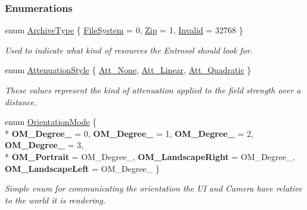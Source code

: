 \subsubsection*{Enumerations}
\begin{DoxyCompactItemize}
\item 
enum \hyperlink{namespaceMezzanine_a25d7f893350196fa99e164f78df3538b}{Archive\-Type} \{ \hyperlink{namespaceMezzanine_a25d7f893350196fa99e164f78df3538ba7d47095245d0d616e56790ddb06978c9}{File\-System} =  0, 
\hyperlink{namespaceMezzanine_a25d7f893350196fa99e164f78df3538ba43428c8ab05d1ac46abc95c021496360}{Zip} =  1, 
\hyperlink{namespaceMezzanine_a25d7f893350196fa99e164f78df3538bac1790df125a6142b8a5b550c95763de5}{Invalid} =  32768
 \}
\begin{DoxyCompactList}\small\item\em Used to indicate what kind of resources the Entrosol should look for. \end{DoxyCompactList}\item 
enum \hyperlink{namespaceMezzanine_a2d10a79e11a2031df10af540eede12fa}{Attenuation\-Style} \{ \hyperlink{namespaceMezzanine_a2d10a79e11a2031df10af540eede12faa548ff9c1d108b12ea6323d39c41856f5}{Att\-\_\-\-None}, 
\hyperlink{namespaceMezzanine_a2d10a79e11a2031df10af540eede12faaaecc4b0547a61e5b2abd5401182c9470}{Att\-\_\-\-Linear}, 
\hyperlink{namespaceMezzanine_a2d10a79e11a2031df10af540eede12faa7f0c2854461a843af7eb21c036375e83}{Att\-\_\-\-Quadratic}
 \}
\begin{DoxyCompactList}\small\item\em These values represent the kind of attenuation applied to the field strength over a distance. \end{DoxyCompactList}\item 
enum \hyperlink{namespaceMezzanine_a8892173bd6aaf7d0e34a07b2b30aad33}{Orientation\-Mode} \{ \\*
{\bfseries O\-M\-\_\-\-Degree\-\_} =  0, 
{\bfseries O\-M\-\_\-\-Degree\-\_} =  1, 
{\bfseries O\-M\-\_\-\-Degree\-\_} =  2, 
{\bfseries O\-M\-\_\-\-Degree\-\_} =  3, 
\\*
{\bfseries O\-M\-\_\-\-Portrait} =  O\-M\-\_\-\-Degree\-\_, 
{\bfseries O\-M\-\_\-\-Landscape\-Right} =  O\-M\-\_\-\-Degree\-\_, 
{\bfseries O\-M\-\_\-\-Landscape\-Left} =  O\-M\-\_\-\-Degree\-\_
 \}
\begin{DoxyCompactList}\small\item\em Simple enum for communicating the orientation the U\-I and Camera have relative to the world it is rendering. \end{DoxyCompactList}\item 

\end{DoxyCompactItemize}
